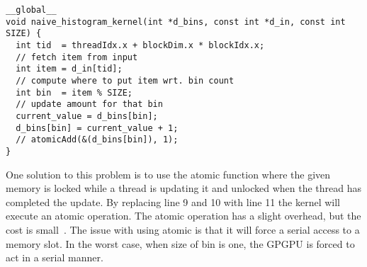 \begin{lstlisting}[caption={Naive histogram implementation with race condition}, label={lst:naive histo}]
__global__
void naive_histogram_kernel(int *d_bins, const int *d_in, const int SIZE) {
  int tid  = threadIdx.x + blockDim.x * blockIdx.x;
  // fetch item from input
  int item = d_in[tid];
  // compute where to put item wrt. bin count
  int bin  = item % SIZE;
  // update amount for that bin
  current_value = d_bins[bin];
  d_bins[bin] = current_value + 1;
  // atomicAdd(&(d_bins[bin]), 1);
}
\end{lstlisting}

One solution to this problem is to use the atomic function where the given memory is locked while a thread is updating it and unlocked when the thread has completed the update.
By replacing line 9 and 10 with line 11 the kernel will execute an atomic operation.
The atomic operation has a slight overhead, but the cost is small~\cite{udacity}.
The issue with using atomic is that it will force a serial access to a memory slot.
In the worst case, when size of bin is one, the GPGPU is forced to act in a serial manner.

